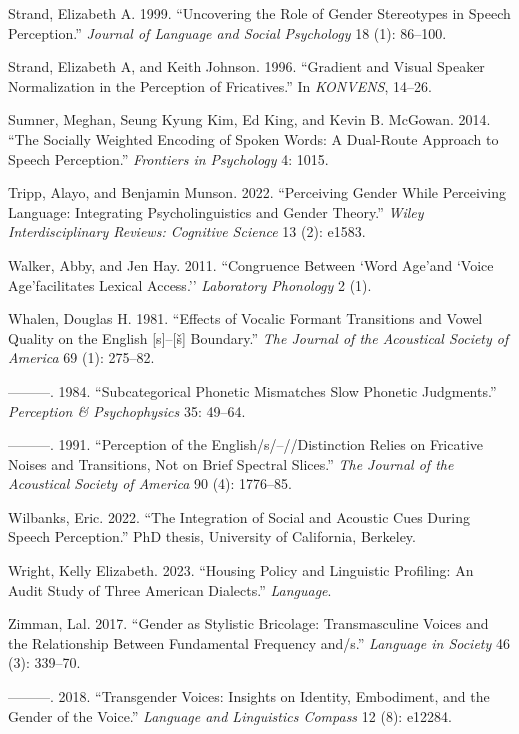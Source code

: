 \documentclass[
  letterpaper,
  DIV=11,
  numbers=noendperiod]{scrartcl}
\newlength{\cslhangindent}
\newenvironment{CSLReferences}[2] %
 {\begin{list}{}{%
  \setlength{\itemindent}{0pt}
  \setlength{\leftmargin}{0pt}
  \setlength{\parsep}{0pt}
  \ifodd #1
   \setlength{\leftmargin}{\cslhangindent}
   \setlength{\itemindent}{-1\cslhangindent}
  \fi
  \setlength{\itemsep}{#2\baselineskip}}}
 {\end{list}}
\begin{document}
\begin{CSLReferences}{1}{0}
Strand, Elizabeth A. 1999. {``Uncovering the Role of Gender Stereotypes
in Speech Perception.''} \emph{Journal of Language and Social
Psychology} 18 (1): 86--100.

Strand, Elizabeth A, and Keith Johnson. 1996. {``Gradient and Visual
Speaker Normalization in the Perception of Fricatives.''} In
\emph{KONVENS}, 14--26.

Sumner, Meghan, Seung Kyung Kim, Ed King, and Kevin B. McGowan. 2014.
{``The Socially Weighted Encoding of Spoken Words: A Dual-Route Approach
to Speech Perception.''} \emph{Frontiers in Psychology} 4: 1015.

Tripp, Alayo, and Benjamin Munson. 2022. {``Perceiving Gender While
Perceiving Language: Integrating Psycholinguistics and Gender Theory.''}
\emph{Wiley Interdisciplinary Reviews: Cognitive Science} 13 (2): e1583.

Walker, Abby, and Jen Hay. 2011. {``Congruence Between `Word Age'and
`Voice Age'facilitates Lexical Access.''} \emph{Laboratory Phonology} 2
(1).

Whalen, Douglas H. 1981. {``Effects of Vocalic Formant Transitions and
Vowel Quality on the English {[}s{]}--{[}{š}{]} Boundary.''} \emph{The
Journal of the Acoustical Society of America} 69 (1): 275--82.

---------. 1984. {``Subcategorical Phonetic Mismatches Slow Phonetic
Judgments.''} \emph{Perception \& {Psychophysics}} 35: 49--64.

---------. 1991. {``Perception of the English/s/--/\int{}/Distinction
Relies on Fricative Noises and Transitions, Not on Brief Spectral
Slices.''} \emph{The Journal of the Acoustical Society of America} 90
(4): 1776--85.

Wilbanks, Eric. 2022. {``The Integration of Social and Acoustic Cues
During Speech Perception.''} PhD thesis, University of California,
Berkeley.

Wright, Kelly Elizabeth. 2023. {``Housing Policy and Linguistic
Profiling: An Audit Study of Three American Dialects.''}
\emph{Language}.

Zimman, Lal. 2017. {``Gender as Stylistic Bricolage: Transmasculine
Voices and the Relationship Between Fundamental Frequency and/s.''}
\emph{Language in Society} 46 (3): 339--70.

---------. 2018. {``Transgender Voices: Insights on Identity,
Embodiment, and the Gender of the Voice.''} \emph{Language and
Linguistics Compass} 12 (8): e12284.

\end{CSLReferences}
\end{document}
